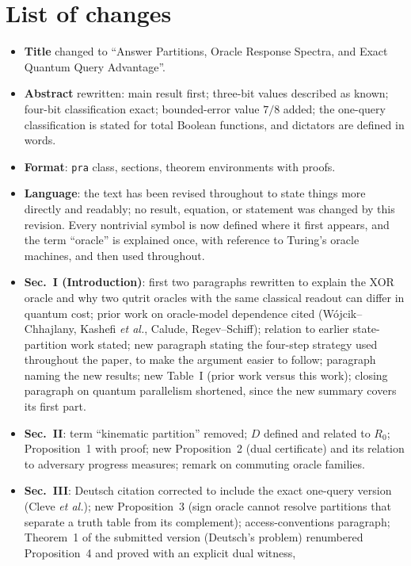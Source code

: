 \documentclass[11pt]{article}
\begin{document}
\section*{List of changes}

\begin{itemize}[leftmargin=*]
\item \textbf{Title} changed to ``Answer Partitions, Oracle Response Spectra, and Exact Quantum Query Advantage''.
\item \textbf{Abstract} rewritten: main result first; three-bit values
described as known; four-bit classification exact; bounded-error value
\(7/8\) added; the one-query classification is stated for total Boolean
functions, and dictators are defined in words.
\item \textbf{Format}: \texttt{pra} class, sections, theorem environments with
proofs.
\item \textbf{Language}: the text has been revised throughout to state things
more directly and readably; no result, equation, or statement was changed by
this revision. Every nontrivial symbol is now defined where it first
appears, and the term ``oracle'' is explained once, with reference to Turing's
oracle machines, and then used throughout.
\item \textbf{Sec.~I (Introduction)}: first two paragraphs rewritten to
explain the XOR oracle and why two qutrit oracles with the same classical
readout can differ in quantum cost; prior work on oracle-model dependence
cited (W\'ojcik--Chhajlany, Kashefi \emph{et al.}, Calude, Regev--Schiff);
relation to earlier state-partition work stated; new paragraph stating the
four-step strategy used throughout the paper, to make the argument easier to
follow; paragraph naming the new results; new Table~I
(prior work versus this work); closing paragraph on quantum parallelism
shortened, since the new summary covers its first part.
\item \textbf{Sec.~II}: term ``kinematic partition'' removed; \(D\) defined
and related to \(R_0\); Proposition~1 with proof; new Proposition~2 (dual
certificate) and its relation to adversary progress measures; remark on
commuting oracle families.
\item \textbf{Sec.~III}: Deutsch citation corrected to include the exact
one-query version (Cleve \emph{et al.}); new Proposition~3 (sign oracle
cannot resolve partitions that separate a truth table from its complement);
access-conventions paragraph; Theorem~1 of the submitted version (Deutsch's
problem) renumbered Proposition~4 and proved with an explicit dual witness,

\end{itemize}
\end{document}
